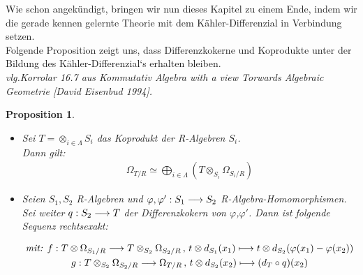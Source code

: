 \documentclass[10pt,a4paper]{report}
\newcommand{\comment}[1]{}
\newcommand{\ModulsOfDifferenzials}{Kommutativ Algebra with a view Torwards Algebraic Geometrie [David Eisenbud 1994]}
\newcounter{Aussage}[chapter]
\newtheorem{prop}[Aussage]{Proposition}
\newcommand{\functionfront}[3]{\nolinebreak{#1:#2 \longrightarrow #3}}
\newcommand{\function}[5]{\nolinebreak{#1:#2 \longrightarrow #3 \, , \, #4 \longmapsto #5}}
\newcommand{\divR}[2]{\Omega_{#1/#2}}
\newcommand{\divf}[1]{d_{#1}}
\newcommand{\Tensor}[3]{#1 \otimes_{#2} #3}
\newcommand{\tensor}[3]{#1 \otimes #3}
\begin{document}
Wie schon angekündigt, bringen wir nun dieses Kapitel zu einem Ende, indem wir die gerade kennen gelernte Theorie mit dem Kähler-Differenzial in Verbindung setzen.\\
Folgende Proposition zeigt uns, dass Differenzkokerne und Koprodukte unter der Bildung des Kähler-Differenzial`s erhalten bleiben.\\
\textit{vlg.Korrolar 16.7 aus \ModulsOfDifferenzials.}
\comment{Beide Beweise sind sehr kurz gefasst}
\begin{prop} \label{Kaehlerdifferenzial des Kolimes von R-Algebren}
\ \\
\begin{itemize}
\item[\textbf{1.}]
Sei $T = \otimes_{i \in \Lambda} S_i$ das Koprodukt der R-Algebren $S_i$.\\
Dann gilt:
\begin{gather*}
\divR{T}{R} \simeq \bigoplus_{i\in \Lambda} ( \Tensor{T}{S_i}{\divR{S_i}{R}} )
\end{gather*}
\item[\textbf{2.}]
Seien $S_1,S_2$ R-Algebren und $\functionfront{\varphi,\varphi'}{S_1}{S_2}$ R-Algebra-Homomorphismen. Sei weiter $\functionfront{q}{S_2}{T}$ der Differenzkokern von $\varphi$,$\varphi '$.
Dann ist folgende Sequenz rechtsexakt:
\begin{center}
\begin{gather*}
\textit{mit: } \function{f}{\tensor{T}{S_1}{\divR{S_1}{R}}}{\Tensor{T}{S_2}{\divR{S_2}{R}}}{\tensor{t}{S_2}{\divf{S_1}(x_1)}}{\tensor{t}{S_2}{\divf{S_2}(\varphi(x_1) - \varphi(x_2))}}\\
\function{g}{\Tensor{T}{S_2}{\divR{S_2}{R}}}{\divR{T}{R}}{\tensor{t}{S_2}{\divf{S_2}(x_2)}}{(\divf{T}\circ q)(x_2)}
\end{gather*}
\end{center}
\end{itemize}
\end{prop}
\end{document}
